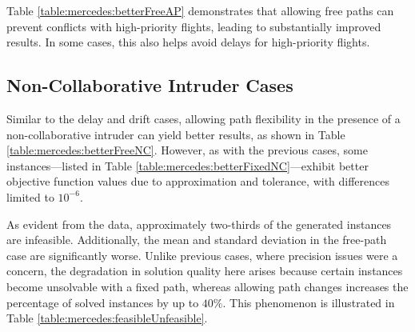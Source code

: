 \documentclass[../../../thesis.tex]{subfiles}
\begin{document}
Table \ref{table:mercedes:betterFreeAP} demonstrates that allowing free paths can prevent conflicts with high-priority flights, leading to substantially improved results. In some cases, this also helps avoid delays for high-priority flights.



\subsection{Non-Collaborative Intruder Cases}
Similar to the delay and drift cases, allowing path flexibility in the presence of a non-collaborative intruder can yield better results, as shown in Table \ref{table:mercedes:betterFreeNC}. However, as with the previous cases, some instances—listed in Table \ref{table:mercedes:betterFixedNC}—exhibit better objective function values due to approximation and tolerance, with differences limited to $10^{-6}$.




As evident from the data, approximately two-thirds of the generated instances are infeasible. Additionally, the mean and standard deviation in the free-path case are significantly worse. Unlike previous cases, where precision issues were a concern, the degradation in solution quality here arises because certain instances become unsolvable with a fixed path, whereas allowing path changes increases the percentage of solved instances by up to $40\%$. This phenomenon is illustrated in Table \ref{table:mercedes:feasibleUnfeasible}.


\end{document}
